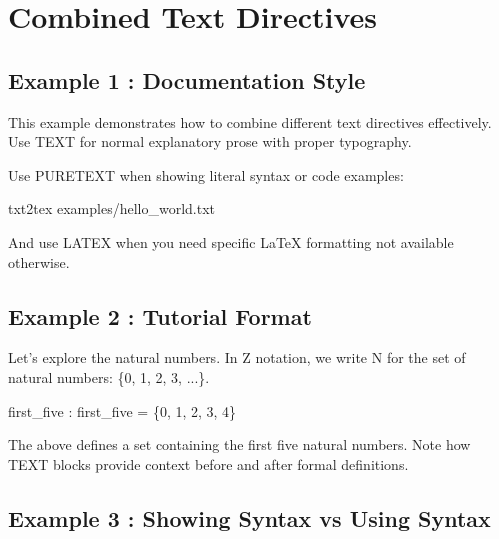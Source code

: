 \documentclass[a4paper,10pt,fleqn]{article}
\begin{document}
\section*{Combined Text Directives}

\subsection*{Example 1 : Documentation Style}

\noindent This example demonstrates how to combine different text directives effectively. Use TEXT for normal explanatory prose with proper typography.

\bigskip

\bigskip

Use PURETEXT when showing literal syntax or code examples:

\bigskip

\bigskip

txt2tex examples/hello\_world.txt

\bigskip

\noindent And use LATEX when you need specific LaTeX formatting not available otherwise.

\bigskip

\subsection*{Example 2 : Tutorial Format}

\noindent Let's explore the natural numbers. In Z notation, we write N for the set of natural numbers: \{0, 1, 2, 3, ...\}.

\bigskip

\begin{axdef}
first\_five : \power \nat
\where
first\_five = \{0, 1, 2, 3, 4\}
\end{axdef}

\medskip

\noindent The above defines a set containing the first five natural numbers. Note how TEXT blocks provide context before and after formal definitions.

\bigskip

\subsection*{Example 3 : Showing Syntax vs Using Syntax}
\end{document}
